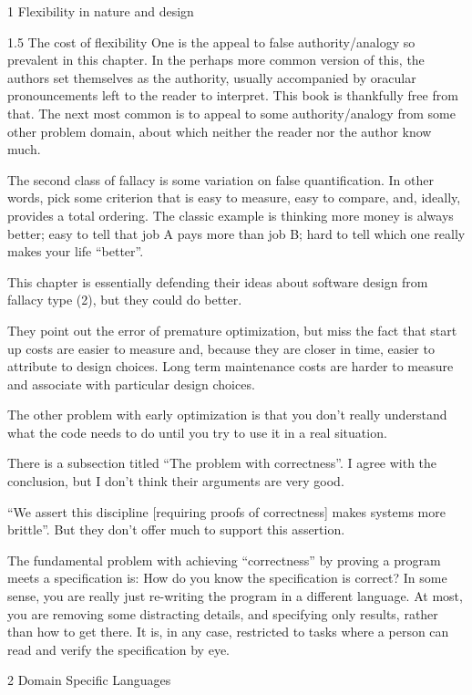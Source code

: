 \documentclass[12pt]{PalisadesLakesBook}
\begin{document}
\begin{plSection}{}
\begin{plSection}{1 Flexibility in nature and design}
\begin{plSection}{1.5 The cost of flexibility}
One is the appeal to false authority/analogy so prevalent in this 
chapter. 
In the perhaps more common version of this, the authors set 
themselves as the authority, 
usually accompanied by oracular pronouncements left to the reader
to interpret.
This book is thankfully free from that.
The next most common is to appeal to some authority/analogy
from some other problem domain, about which 
neither the reader nor the author know much.

The second class of fallacy is some variation on false 
quantification. 
In other words, pick some criterion that is
easy to measure, easy to compare, and, ideally,
provides a total ordering. 
The classic example is thinking more money is always better;
easy to tell that job A pays more than job B;
hard to tell which one really makes your life ``better''.

This chapter is essentially defending their ideas about software
design from fallacy type (2),
but they could do better.

They point out the error of premature optimization,
but miss the fact that start up costs are easier to measure
and, because they are closer in time, easier to attribute to
design choices. 
Long term maintenance costs are harder to measure and
associate with particular design choices.

The other problem with early optimization is that you don't
really understand what the code needs to do until you try to
use it in a real situation.

There is a subsection titled ``The problem with correctness''.
I agree with the conclusion, but I don't think their arguments
are very good.

``We assert this discipline [requiring proofs of correctness]
makes systems more brittle''.
But they don't offer much to support this assertion.

The fundamental problem with achieving ``correctness''
by proving a program meets a specification is:
How do you know the specification is correct?
In some sense, you are really just re-writing the program
in a different language.
At most, you are removing some distracting details,
and specifying only results, rather than how to get there.
It is, in any case, restricted to tasks  where a person can
read and verify the specification by eye.

\end{plSection}%
\end{plSection}%
\begin{plSection}{2 Domain Specific Languages}


\end{plSection}
\end{plSection}
\end{document}
